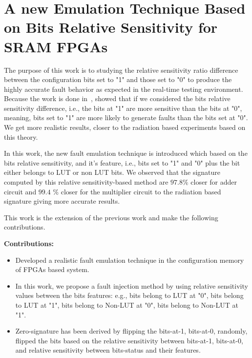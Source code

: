 

\section{A new Emulation Technique Based on Bits Relative Sensitivity
for SRAM FPGAs}
\label{intro}


The purpose of this work is to  studying the relative sensitivity ratio difference between the configuration bits set to "1" and those set to "0" to produce the highly accurate fault behavior as expected in the real-time testing environment. Because the work is done in~\citep{souari2016towards}, showed that if we considered the bits relative sensitivity difference, i.e., the bits at "1" are more sensitive than the bits at "0", meaning, bits set to "1" are more likely to generate faults than the bits set at "0". We get more realistic results, closer to the radiation based experiments based on this theory. 

In this work, the new fault emulation technique is introduced which based on the bits relative sensitivity, and it's feature, i.e., bits set to "1" and "0" plus the bit either belongs to LUT or non LUT bits.  We observed that the signature computed by this relative sensitivity-based method are $97.8$\% closer for adder circuit and $99.4$ \% closer for the multiplier circuit to the radiation based signature giving more accurate results.

This work is the extension of the previous work and make the following contributions. 


\textbf{Contributions:} \\

\begin{itemize}



\item{Developed a realistic fault emulation technique in the configuration memory
of FPGAs based system}.

\item{In this work, we propose a fault injection method by using relative sensitivity values between the bits features: e.g., bits belong to LUT at "0", bits belong to LUT at "1", bits belong to Non-LUT at "0", bits belong to Non-LUT at "1"}.

\item{Zero-signature has been derived by flipping the bits-at-1, bits-at-0, randomly, flipped the bits based on the relative sensitivity between bits-at-1, bits-at-0, and relative sensitivity between bits-status and their features}.
\end{itemize}


